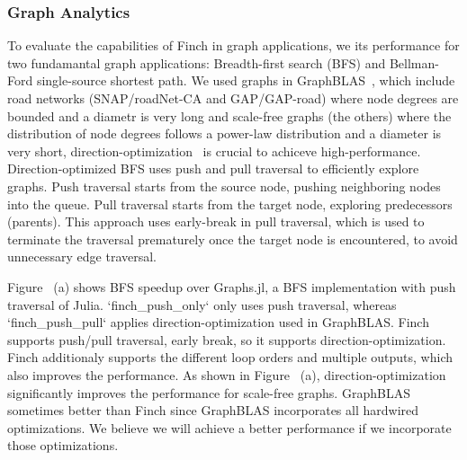 \subsubsection{Graph Analytics}

To evaluate the capabilities of Finch in graph applications, we its performance for two fundamantal graph applications: Breadth-first search (BFS) and Bellman-Ford single-source shortest path. We used graphs in GraphBLAS~\cite{}, which include road networks (SNAP/roadNet-CA and GAP/GAP-road) where node degrees are bounded and a diametr is very long and scale-free graphs (the others) where the distribution of node degrees follows a power-law distribution and a diameter is very short, direction-optimization~\cite{} is crucial to achiceve high-performance. Direction-optimized BFS uses push and pull traversal to efficiently explore graphs. Push traversal starts from the source node, pushing neighboring nodes into the queue. Pull traversal starts from the target node, exploring predecessors (parents). This approach uses early-break in pull traversal, which is used to terminate the traversal prematurely once the target node is encountered, to avoid unnecessary edge traversal. 

Figure~\cite{graph_result} (a)  shows BFS speedup over Graphs.jl, a BFS implementation with push traversal of Julia. `finch\_push\_only` only uses push traversal, whereas `finch\_push\_pull` applies direction-optimization used in GraphBLAS. Finch supports push/pull traversal, early break, so it supports direction-optimization. Finch additionaly supports the different loop orders and multiple outputs, which also improves the performance. As shown in Figure~\cite{graph_result} (a), direction-optimization significantly improves the performance for scale-free graphs.  GraphBLAS sometimes better than Finch since GraphBLAS incorporates all hardwired optimizations. We believe we will achieve a better performance if we incorporate those optimizations. 



